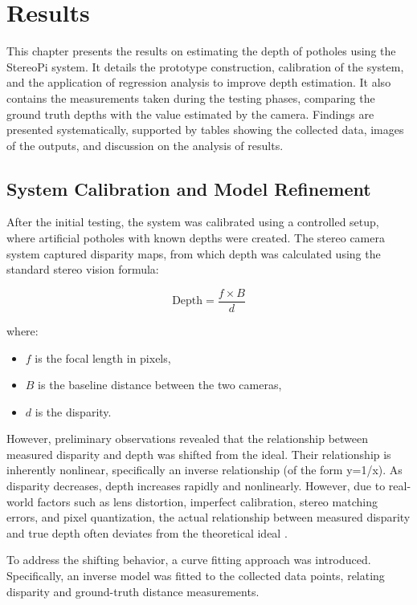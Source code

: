 \chapter{Results}
This chapter presents the results on estimating the depth of potholes using the StereoPi system. It details the prototype construction, calibration of the system, and the application of regression analysis to improve depth estimation. It also contains the measurements taken during the testing phases, comparing the ground truth depths with the value estimated by the camera. Findings are presented systematically, supported by tables showing the collected data, images of the outputs, and discussion on the analysis of results.

\section{System Calibration and Model Refinement}
After the initial testing, the system was calibrated using a controlled setup, where artificial potholes with known depths were created. The stereo camera system captured disparity maps, from which depth was calculated using the standard stereo vision formula:

\[
\text{Depth} = \frac{f \times B}{d}
\]

where:
\begin{itemize}
	\item \( f \) is the focal length in pixels,
	\item \( B \) is the baseline distance between the two cameras,
	\item \( d \) is the disparity.
\end{itemize}


However, preliminary observations revealed that the relationship between measured disparity and depth was shifted from the ideal. Their relationship is inherently nonlinear, specifically an inverse relationship (of the form y=1/x). As disparity decreases, depth increases rapidly and nonlinearly. However, due to real-world factors such as lens distortion, imperfect calibration, stereo matching errors, and pixel quantization, the actual relationship between measured disparity and true depth often deviates from the theoretical ideal \cite{scharstein2002}.

To address the shifting behavior, a curve fitting approach was introduced. Specifically, an inverse model was fitted to the collected data points, relating disparity and ground-truth distance measurements.

